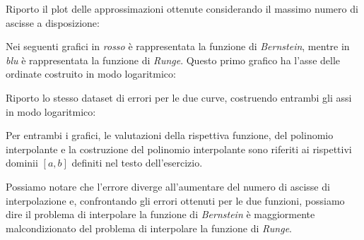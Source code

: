 Riporto il plot delle approssimazioni ottenute considerando il massimo numero di
ascisse a disposizione:
\begin{center}  

\end{center}

Nei seguenti grafici in
\emph{rosso} \`e rappresentata la funzione di \emph{Bernstein}, mentre in \emph{blu} \`e rappresentata la funzione di
\emph{Runge}. Questo primo grafico ha l'asse delle ordinate costruito in
modo logaritmico:
\begin{center}   

\end{center}
Riporto lo stesso dataset di errori per le due curve, costruendo entrambi gli
assi in modo logaritmico:
\begin{center}  

\end{center}
Per entrambi i grafici, le valutazioni della rispettiva funzione, del polinomio
interpolante e la costruzione del polinomio interpolante sono riferiti ai
rispettivi dominii $[a,b]$ definiti nel testo dell'esercizio.

Possiamo notare che l'errore diverge all'aumentare del numero di ascisse di
interpolazione e, confrontando gli errori ottenuti per le due funzioni, possiamo
dire il problema di interpolare la funzione di \emph{Bernstein} \`e maggiormente
malcondizionato del problema di interpolare la funzione di \emph{Runge}.

